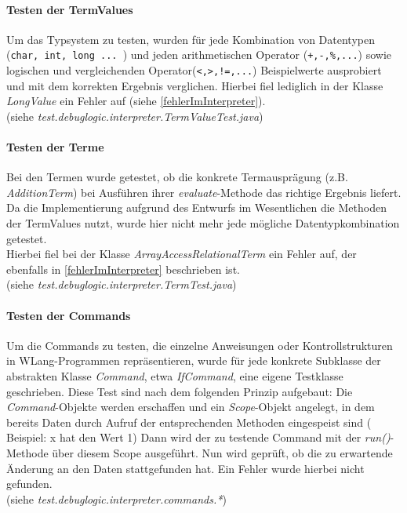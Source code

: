 \documentclass[parskip=full]{scrartcl}
\begin{document}
\paragraph{Testen der TermValues}
Um das Typsystem zu testen, wurden für jede Kombination von Datentypen (\texttt{char, int, long ... }) und jeden arithmetischen Operator (\texttt{+,-,\%,...}) sowie logischen und vergleichenden Operator(\texttt{<,>,!=,...}) Beispielwerte ausprobiert und mit dem korrekten Ergebnis verglichen. Hierbei fiel lediglich in der Klasse \textit{LongValue} ein Fehler auf (siehe \ref{fehlerImInterpreter}).\\
(siehe \textit{test.debuglogic.interpreter.TermValueTest.java})
\paragraph{Testen der Terme}
Bei den Termen wurde getestet, ob die konkrete Termausprägung (z.B. \textit{AdditionTerm}) bei Ausführen ihrer \textit{evaluate}-Methode das richtige Ergebnis liefert. \\
Da die Implementierung aufgrund des Entwurfs im Wesentlichen die Methoden der TermValues nutzt, wurde hier nicht mehr jede mögliche Datentypkombination getestet.\\
Hierbei fiel bei der Klasse \textit{ArrayAccessRelationalTerm} ein Fehler auf, der ebenfalls in \ref{fehlerImInterpreter} beschrieben ist. \\
(siehe \textit{test.debuglogic.interpreter.TermTest.java})
\paragraph{Testen der Commands}
Um die Commands zu testen, die einzelne Anweisungen oder Kontrollstrukturen in WLang-Programmen repräsentieren, wurde für jede konkrete Subklasse der abstrakten Klasse \textit{Command}, etwa \textit{IfCommand}, eine eigene Testklasse geschrieben. Diese Test sind nach dem folgenden Prinzip aufgebaut: Die \textit{Command}-Objekte werden erschaffen und ein \textit{Scope}-Objekt angelegt, in dem bereits Daten durch Aufruf der entsprechenden Methoden eingespeist sind ( Beispiel: x hat den Wert 1)
Dann wird der zu testende Command mit der \textit{run()}-Methode über diesem Scope ausgeführt. Nun wird geprüft, ob die zu erwartende Änderung an den Daten stattgefunden hat.
Ein Fehler wurde hierbei nicht gefunden.\\
(siehe \textit{test.debuglogic.interpreter.commands.*})
\end{document}

